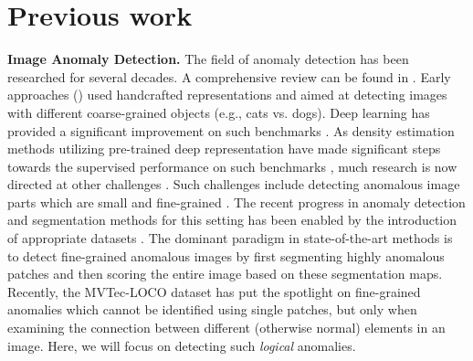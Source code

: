 \documentclass{article}
\begin{document}
\section{Previous work}


\textbf{Image Anomaly Detection.}
The field of anomaly detection has been researched for several decades. A comprehensive review can be found in \cite{ruff2021unifying}. Early approaches (\cite{glodek2013ensemble,latecki2007outlier,eskin2002geometric}) used handcrafted representations and aimed at detecting images with different coarse-grained objects (e.g., cats vs. dogs). Deep learning has provided a significant improvement on such benchmarks \cite{larsson2016learning, ruff2018deep,golan2018deep,hendrycks2019using,ruff2019deep,perera2019learning,mkd,csi}. As density estimation methods utilizing pre-trained deep representation have made significant steps towards the supervised performance on such benchmarks \cite{deecke2021transfer,cohen2022transformaly,panda,mean_shifted,reiss2022anomaly}, much research is now directed at other challenges \cite{reiss2022anomaly}. Such challenges include detecting anomalous image parts which are small and fine-grained \cite{cohen2020sub,li2021cutpaste,defard2021padim,roth2022towards,horwitz2022empirical}. The recent progress in anomaly detection and segmentation methods for this setting has been enabled by the introduction of appropriate datasets \cite{bergmann2019mvtec,bergmann2021mvtec,carrera2016defect,jezek2021deep}. The dominant paradigm in state-of-the-art methods \cite{roth2022towards} is to detect fine-grained anomalous images by first segmenting highly anomalous patches and then scoring the entire image based on these segmentation maps. Recently, the MVTec-LOCO dataset\cite{bergmann2022beyond} has put the spotlight on fine-grained anomalies which cannot be identified using single patches, but only when examining the connection between different (otherwise normal) elements in an image. Here, we will focus on detecting such \textit{logical} anomalies.
\end{document}

